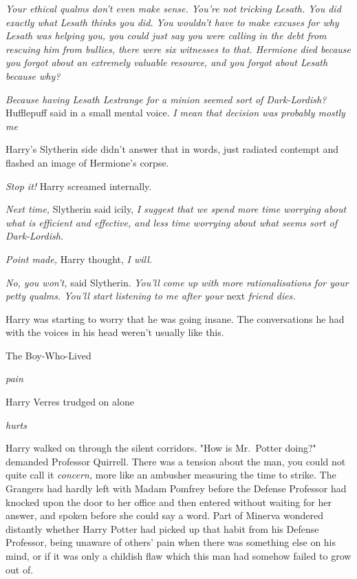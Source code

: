 \emph{Your ethical qualms don't even make sense. You're not tricking Lesath.
You did exactly what Lesath thinks you did. You wouldn't have to make excuses
for why Lesath was helping you, you could just say you were calling in the debt
from rescuing him from bullies, there were six witnesses to that. Hermione died
because you forgot about an extremely valuable resource, and you forgot about
Lesath because{\el} why?}

\emph{Because having Lesath Lestrange for a minion seemed sort of
Dark-Lordish?} Hufflepuff said in a small mental voice. \emph{I mean{\el}
that decision was probably mostly me{\el}}

Harry's Slytherin side didn't answer that in words, just radiated contempt and
flashed an image of Hermione's corpse.

\emph{Stop it!} Harry screamed internally.

\emph{Next time,} Slytherin said icily, \emph{I suggest that we spend more time
worrying about what is efficient and effective, and less time worrying about
what seems sort of Dark-Lordish.}

\emph{Point made,} Harry thought, \emph{I will.}

\emph{No, you won't,} said Slytherin. \emph{You'll come up with more
rationalisations for your petty qualms. You'll start listening to me after
your} next \emph{friend dies.}

Harry was starting to worry that he was going insane. The conversations he had
with the voices in his head weren't usually like this.

The Boy-Who-Lived

\emph{pain}

Harry Verres trudged on alone

\emph{hurts}

Harry walked on through the silent corridors.
\sbreak
"How is Mr.~Potter doing?" demanded Professor Quirrell. There was a tension
about the man, you could not quite call it \emph{concern,} more like an
ambusher measuring the time to strike. The Grangers had hardly left with Madam
Pomfrey before the Defense Professor had knocked upon the door to her office
and then entered without waiting for her answer, and spoken before she could
say a word. Part of Minerva wondered distantly whether Harry Potter had picked
up that habit from his Defense Professor, being unaware of others' pain when
there was something else on his mind, or if it was only a childish flaw which
this man had somehow failed to grow out of.

